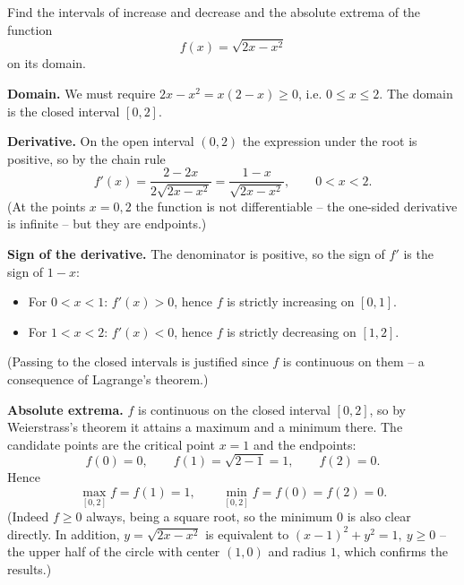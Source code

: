 
\begin{question}
Find the intervals of increase and decrease and the absolute extrema of the function
\[ f(x)=\sqrt{2x-x^2} \]
on its domain.
\end{question}

\begin{solution}
\textbf{Domain.} We must require $2x-x^2=x(2-x)\ge0$, i.e. $0\le x\le 2$. The domain is the closed interval $[0,2]$.

\textbf{Derivative.} On the open interval $(0,2)$ the expression under the root is positive, so by the chain rule
\[ f'(x)=\frac{2-2x}{2\sqrt{2x-x^2}}=\frac{1-x}{\sqrt{2x-x^2}},\qquad 0<x<2. \]
(At the points $x=0,2$ the function is not differentiable -- the one-sided derivative is infinite -- but they are endpoints.)

\textbf{Sign of the derivative.} The denominator is positive, so the sign of $f'$ is the sign of $1-x$:
\begin{itemize}
  \item For $0<x<1$: $f'(x)>0$, hence $f$ is strictly increasing on $[0,1]$.
  \item For $1<x<2$: $f'(x)<0$, hence $f$ is strictly decreasing on $[1,2]$.
\end{itemize}
(Passing to the closed intervals is justified since $f$ is continuous on them -- a consequence of Lagrange's theorem.)

\textbf{Absolute extrema.} $f$ is continuous on the closed interval $[0,2]$, so by Weierstrass's theorem it attains a maximum and a minimum there. The candidate points are the critical point $x=1$ and the endpoints:
\[ f(0)=0,\qquad f(1)=\sqrt{2-1}=1,\qquad f(2)=0. \]
Hence
\[ \boxed{\max_{[0,2]}f=f(1)=1,\qquad \min_{[0,2]}f=f(0)=f(2)=0.} \]
(Indeed $f\ge0$ always, being a square root, so the minimum $0$ is also clear directly. In addition, $y=\sqrt{2x-x^2}$ is equivalent to $(x-1)^2+y^2=1,\ y\ge0$ -- the upper half of the circle with center $(1,0)$ and radius $1$, which confirms the results.)
\end{solution}

